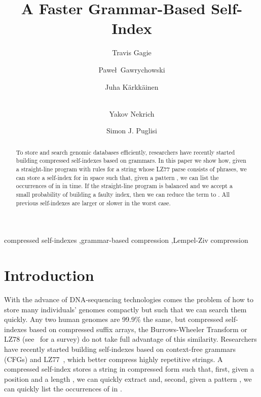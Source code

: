 \documentclass[review]{elsarticle}
\begin{document}
\begin{frontmatter}

\title{A Faster Grammar-Based Self-Index}

\author[aalto]{Travis Gagie}
\author[mpi]{Pawe\l\ Gawrychowski}
\author[helsinki]{Juha K\"arkk\"ainen}
\author[chile]{\\Yakov Nekrich}
\author[helsinki]{Simon J. Puglisi}
\address[aalto]{Aalto University}
\address[mpi]{Max Planck Institute}
\address[helsinki]{University of Helsinki}
\address[chile]{University of Chile}

\begin{abstract}
To store and search genomic databases efficiently, researchers have recently started building compressed self-indexes based on grammars.  In this paper we show how, given a straight-line program with  rules for a string  whose LZ77 parse consists of  phrases, we can store a self-index for  in  space such that, given a pattern , we can list the  occurrences of  in  in  time.  If the straight-line program is balanced and we accept a small probability of building a faulty index, then we can reduce the  term to .  All previous self-indexes are larger or slower in the worst case.
\end{abstract}

\begin{keyword}
compressed self-indexes \sep grammar-based compression \sep Lempel-Ziv compression
\end{keyword}

\end{frontmatter}

\section{Introduction} \label{sec:intro}

With the advance of DNA-sequencing technologies comes the problem of how to store many individuals' genomes compactly but such that we can search them quickly.  Any two human genomes are 99.9\% the same, but compressed self-indexes based on compressed suffix arrays, the Burrows-Wheeler Transform or LZ78 (see~\cite{NM07} for a survey) do not take full advantage of this similarity.  Researchers have recently started building self-indexes based on context-free grammars (CFGs) and LZ77~\cite{ZL77}, which better compress highly repetitive strings.  A compressed self-index stores a string  in compressed form such that, first, given a position  and a length , we can quickly extract  and, second, given a pattern , we can quickly list the  occurrences of  in .
\end{document}
